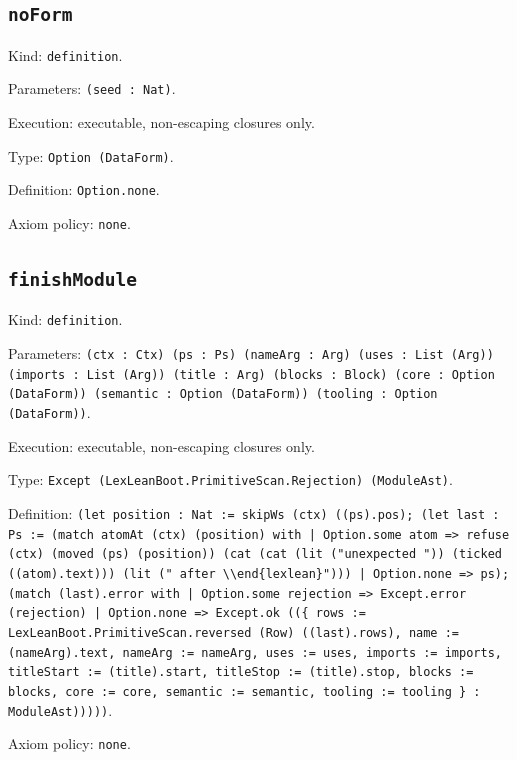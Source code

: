 \documentclass[11pt]{article}
\begin{document}
\subsection*{\texttt{noForm}}
\noindent Kind: \texttt{definition}.\par
\noindent Parameters: \texttt{(seed : Nat)}.\par
\noindent Execution: executable, non-escaping closures only.\par
\noindent Type: \texttt{Option (DataForm)}.\par
\noindent Definition: \texttt{Option.none}.\par
\noindent Axiom policy: \texttt{none}.\par
\subsection*{\texttt{finishModule}}
\noindent Kind: \texttt{definition}.\par
\noindent Parameters: \texttt{(ctx : Ctx) (ps : Ps) (nameArg : Arg) (uses : List (Arg)) (imports : List (Arg)) (title : Arg) (blocks : Block) (core : Option (DataForm)) (semantic : Option (DataForm)) (tooling : Option (DataForm))}.\par
\noindent Execution: executable, non-escaping closures only.\par
\noindent Type: \texttt{Except (LexLeanBoot.PrimitiveScan.Rejection) (ModuleAst)}.\par
\noindent Definition: \texttt{(let position : Nat := skipWs (ctx) ((ps).pos); (let last : Ps := (match atomAt (ctx) (position) with | Option.some atom => refuse (ctx) (moved (ps) (position)) (cat (cat (lit ("unexpected ")) (ticked ((atom).text))) (lit (" after \textbackslash{}\textbackslash{}end\{lexlean\}"))) | Option.none => ps); (match (last).error with | Option.some rejection => Except.error (rejection) | Option.none => Except.ok ((\{ rows := LexLeanBoot.PrimitiveScan.reversed (Row) ((last).rows), name := (nameArg).text, nameArg := nameArg, uses := uses, imports := imports, titleStart := (title).start, titleStop := (title).stop, blocks := blocks, core := core, semantic := semantic, tooling := tooling \} : ModuleAst)))))}.\par
\noindent Axiom policy: \texttt{none}.\par
\end{document}
